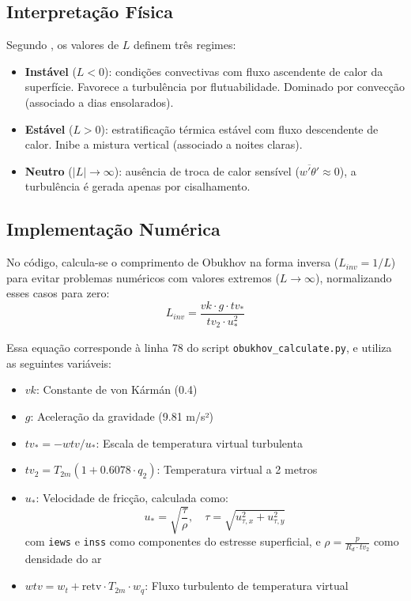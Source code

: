 \documentclass[12pt]{article}
\begin{document}
\subsection{Interpretação Física}
Segundo \citep{ecmwf_obukhov_era5_guide}, os valores de $L$ definem três regimes:
\begin{itemize}
    \item \textbf{Instável} ($L < 0$): condições convectivas com fluxo ascendente de calor da superfície. Favorece a turbulência por flutuabilidade. Dominado por convecção (associado a dias ensolarados).
    \item \textbf{Estável} ($L > 0$): estratificação térmica estável com fluxo descendente de calor. Inibe a mistura vertical (associado a noites claras).
    \item \textbf{Neutro} ($|L| \to \infty$): ausência de troca de calor sensível ($\overline{w'\theta'} \approx 0$), a turbulência é gerada apenas por cisalhamento.
\end{itemize}

\subsection{Implementação Numérica}
No código, calcula-se o comprimento de Obukhov na forma inversa ($L_{inv} = 1/L$) para evitar problemas numéricos com valores extremos ($L \to \infty$), normalizando esses casos para zero:
\begin{equation}
L_{inv} = \frac{vk \cdot g \cdot tv_{*}}{tv_2 \cdot u_*^2}
\end{equation}

Essa equação corresponde à linha 78 do script \texttt{obukhov\_calculate.py}, e utiliza as seguintes variáveis:
\begin{itemize}
    \item $vk$: Constante de von Kármán (0.4)
    \item $g$: Aceleração da gravidade (9.81 m/s²)
    \item $tv_{*} = -wtv / u_*$: Escala de temperatura virtual turbulenta
    \item $tv_2 = T_{2m}(1 + 0.6078 \cdot q_2)$: Temperatura virtual a 2 metros
    \item $u_*$: Velocidade de fricção, calculada como:
    \[
    u_* = \sqrt{\frac{\tau}{\rho}}, \quad \tau = \sqrt{u_{\tau,x}^2 + u_{\tau,y}^2}
    \]
    com \texttt{iews} e \texttt{inss} como componentes do estresse superficial, e $\rho = \frac{p}{R_d \cdot tv_2}$ como densidade do ar
    \item $wtv = w_t + \text{retv} \cdot T_{2m} \cdot w_q$: Fluxo turbulento de temperatura virtual
\end{itemize}
\end{document}
